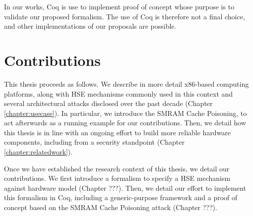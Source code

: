 In our works, Coq is use to implement proof of concept whose purpose is to
validate our proposed formalism.
%
The use of Coq is therefore not a final choice, and other implementations of our
proposals are possible.

\section{Contributions}

This thesis proceeds as follows.
%
We describe in more detail x86-based computing platforms, along with HSE
mechanisms commonly used in this context and several architectural attacks
disclosed over the past decade (Chapter\,\ref{chapter:usecase}).
%
In particular, we introduce the SMRAM Cache Poisoning, to act afterwards as a
running example for our contributions.
%
Then, we detail how this thesis is in line with an ongoing effort to build more
reliable hardware components, including from a security standpoint
(Chapter\,\ref{chapter:relatedwork}).

Once we have established the research context of this thesis, we detail our
contributions.
%
We first introduce a formalism to specify a HSE mechanism against hardware model
(Chapter ???).
%
Then, we detail our effort to implement this formalism in Coq, including a
generic-purpose framework and a proof of concept based on the SMRAM Cache
Poisoning attack (Chapter ???).
%
